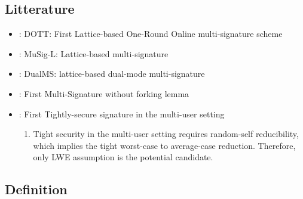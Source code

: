 \subsection{Litterature}
\begin{itemize}
    \item \cite{C:BosTakTib22}: DOTT: First Lattice-based One-Round Online multi-signature scheme
    \item \cite{C:BosTakTib22}: MuSig-L: Lattice-based multi-signature
    \item \cite{C:Chen23}: DualMS: lattice-based dual-mode multi-signature 
    \item \cite{EC:PanWag23}: First Multi-Signature without forking lemma
    \item \cite{PKC:PanWag22}: First Tightly-secure signature in the multi-user setting
    \begin{enumerate}
        \item Tight security in the multi-user setting requires random-self reducibility, which implies the tight worst-case to average-case reduction. Therefore, only LWE assumption is the potential candidate.
    \end{enumerate}
\end{itemize}

\subsection{Definition}

